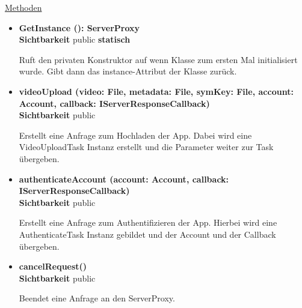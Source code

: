 \underline{Methoden}
\begin{itemize}
\itemsep0pt

\item \textbf{GetInstance (): ServerProxy}\hfill\\
\textbf{Sichtbarkeit} public \newline
\textbf{statisch} 

Ruft den privaten Konstruktor auf wenn Klasse zum ersten Mal initialisiert wurde. Gibt dann das instance-Attribut der Klasse zurück.

\item \textbf{videoUpload (video: File, metadata: File, symKey: File, account: Account, callback: IServerResponseCallback)}\hfill\\
\textbf{Sichtbarkeit} public

Erstellt eine Anfrage zum Hochladen der App. Dabei wird eine VideoUploadTask Instanz erstellt und die Parameter weiter zur  Task übergeben.

\item \textbf{authenticateAccount (account: Account, callback: IServerResponseCallback)}\hfill\\
\textbf{Sichtbarkeit} public

Erstellt eine Anfrage zum Authentifizieren der App. Hierbei wird eine AuthenticateTask Instanz gebildet und der Account und der Callback übergeben.

\item \textbf{cancelRequest()}\hfill\\
\textbf{Sichtbarkeit} public

Beendet eine Anfrage an den ServerProxy.

\end{itemize}
